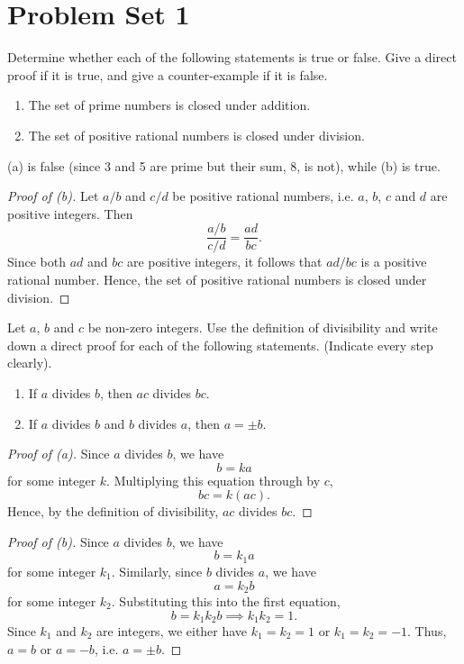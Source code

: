 \section{Problem Set 1}

\begin{problem}
    Determine whether each of the following statements is true or false. Give a direct proof if it is true, and give a counter-example if it is false.

    \begin{enumerate}
        \item The set of prime numbers is closed under addition.
        \item The set of positive rational numbers is closed under division.
    \end{enumerate}
\end{problem}

\begin{solution}
    (a) is false (since 3 and 5 are prime but their sum, 8, is not), while (b) is true.

    \begin{proof}[Proof of \emph{(b)}]
        Let $a/b$ and $c/d$ be positive rational numbers, i.e. $a$, $b$, $c$ and $d$ are positive integers. Then \[\frac{a/b}{c/d} = \frac{ad}{bc}.\] Since both $ad$ and $bc$ are positive integers, it follows that $ad/bc$ is a positive rational number. Hence, the set of positive rational numbers is closed under division.
    \end{proof}
\end{solution}

\begin{problem}
    Let $a$, $b$ and $c$ be non-zero integers. Use the definition of divisibility and write down a direct proof for each of the following statements. (Indicate every step clearly).

    \begin{enumerate}
        \item If $a$ divides $b$, then $ac$ divides $bc$.
        \item If $a$ divides $b$ and $b$ divides $a$, then $a = \pm b$.
    \end{enumerate}
\end{problem}
\begin{solution}
    \begin{proof}[Proof of \emph{(a)}]
        Since $a$ divides $b$, we have \[b = ka\] for some integer $k$. Multiplying this equation through by $c$, \[bc = k(ac).\] Hence, by the definition of divisibility, $ac$ divides $bc$.
    \end{proof}
    \begin{proof}[Proof of \emph{(b)}]
        Since $a$ divides $b$, we have \[b = k_1a\] for some integer $k_1$. Similarly, since $b$ divides $a$, we have \[a = k_2 b\] for some integer $k_2$. Substituting this into the first equation, \[b = k_1 k_2 b \implies k_1 k_2 = 1.\] Since $k_1$ and $k_2$ are integers, we either have $k_1 = k_2 = 1$ or $k_1 = k_2 = -1$. Thus, $a = b$ or $a = -b$, i.e. $a = \pm b$.
    \end{proof}
\end{solution}


